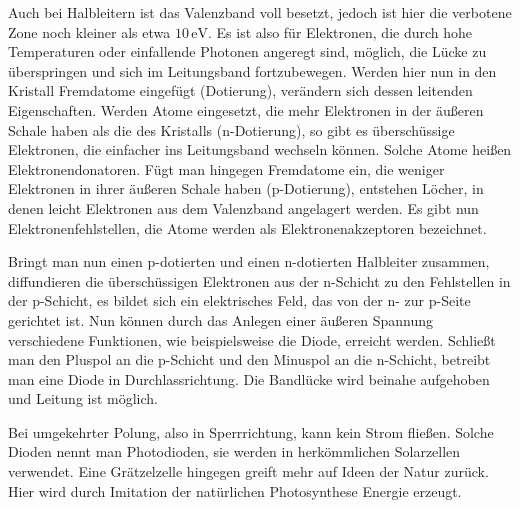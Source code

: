 \documentclass[11pt]{scrartcl}
\newcommand{\unit}[1]{\ensuremath{\,\mathrm{#1}}} %
\begin{document}
Auch bei Halbleitern ist das Valenzband voll besetzt, jedoch ist hier die verbotene Zone noch kleiner als etwa $10\unit{eV}$. Es ist also f\"ur Elektronen, die durch hohe Temperaturen oder einfallende Photonen angeregt sind, m\"oglich, die L\"ucke zu \"uberspringen und sich im Leitungsband fortzubewegen. Werden hier nun in den Kristall Fremdatome eingef\"ugt (Dotierung), ver\"andern sich dessen leitenden Eigenschaften. Werden Atome eingesetzt, die mehr Elektronen in der \"au\ss{}eren Schale haben als die des Kristalls (n-Dotierung), so gibt es \glqq\"ubersch\"ussige\grqq{} Elektronen, die einfacher ins Leitungsband wechseln k\"onnen. Solche Atome hei\ss{}en Elektronendonatoren. F\"ugt man hingegen Fremdatome ein, die weniger Elektronen in ihrer \"au\ss{}eren Schale haben (p-Dotierung), entstehen L\"ocher, in denen leicht Elektronen aus dem Valenzband angelagert werden. Es gibt nun Elektronenfehlstellen, die Atome werden als Elektronenakzeptoren bezeichnet.

Bringt man nun einen p-dotierten und einen n-dotierten Halbleiter zusammen, diffundieren die \"ubersch\"ussigen Elektronen aus der n-Schicht zu den Fehlstellen in der p-Schicht, es bildet sich ein elektrisches Feld, das von der n- zur p-Seite gerichtet ist. Nun k\"onnen durch das Anlegen einer \"au\ss{}eren Spannung verschiedene Funktionen, wie beispielsweise die Diode, erreicht werden. Schließt man den Pluspol an die p-Schicht und den Minuspol an die n-Schicht, betreibt man eine Diode in Durchlassrichtung. Die Bandl\"ucke wird beinahe aufgehoben und Leitung ist m\"oglich.

Bei umgekehrter Polung, also in Sperrrichtung, kann kein Strom flie\ss{}en. Solche Dioden nennt man Photodioden, sie werden in herk\"ommlichen Solarzellen verwendet. Eine Gr\"atzelzelle hingegen greift mehr auf Ideen der Natur zur\"uck. Hier wird durch Imitation der nat\"urlichen Photosynthese Energie erzeugt.
\end{document}
